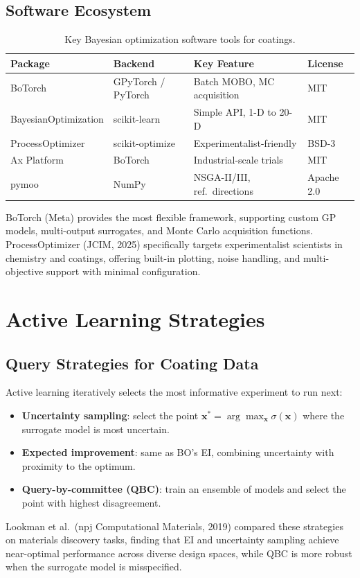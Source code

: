 \documentclass[11pt,a4paper]{article}
\begin{document}
\subsection{Software Ecosystem}

\begin{table}[h]
\centering
\caption{Key Bayesian optimization software tools for coatings.}
\label{tab:software}
\small
\begin{tabular}{@{}llll@{}}
\toprule
\textbf{Package} & \textbf{Backend} & \textbf{Key Feature} & \textbf{License} \\
\midrule
BoTorch & GPyTorch / PyTorch & Batch MOBO, MC acquisition & MIT \\
BayesianOptimization & scikit-learn & Simple API, 1-D to 20-D & MIT \\
ProcessOptimizer & scikit-optimize & Experimentalist-friendly & BSD-3 \\
Ax Platform & BoTorch & Industrial-scale trials & MIT \\
pymoo & NumPy & NSGA-II/III, ref.\ directions & Apache 2.0 \\
\bottomrule
\end{tabular}
\end{table}

BoTorch (Meta) provides the most flexible framework, supporting custom GP models, multi-output surrogates, and Monte Carlo acquisition functions.
ProcessOptimizer (JCIM, 2025) specifically targets experimentalist scientists in chemistry and coatings, offering built-in plotting, noise handling, and multi-objective support with minimal configuration.

\section{Active Learning Strategies}
\label{sec:activelearn}

\subsection{Query Strategies for Coating Data}

Active learning iteratively selects the most informative experiment to run next:
\begin{itemize}[nosep]
  \item \textbf{Uncertainty sampling}: select the point $\mathbf{x}^* = \arg\max_{\mathbf{x}} \sigma(\mathbf{x})$ where the surrogate model is most uncertain.
  \item \textbf{Expected improvement}: same as BO's EI, combining uncertainty with proximity to the optimum.
  \item \textbf{Query-by-committee (QBC)}: train an ensemble of models and select the point with highest disagreement.
\end{itemize}
Lookman et al.\ (npj Computational Materials, 2019) compared these strategies on materials discovery tasks, finding that EI and uncertainty sampling achieve near-optimal performance across diverse design spaces, while QBC is more robust when the surrogate model is misspecified.
\end{document}
